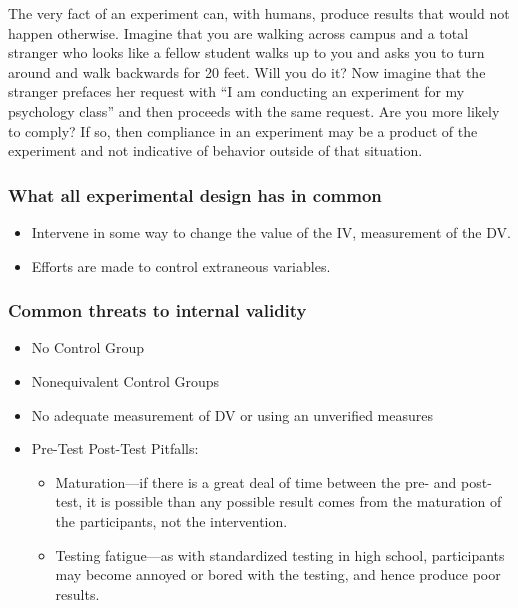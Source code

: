 \begin{refsection}
The very fact of an experiment can, with humans, produce results that would not happen otherwise. Imagine that you are walking across campus and a total stranger who looks like a fellow student walks up to you and asks you to turn around and walk backwards for 20 feet. Will you do it? Now imagine that the stranger prefaces her request with “I am conducting an experiment for my psychology class” and then proceeds with the same request. Are you more likely to comply? If so, then compliance in an experiment may be a product of the experiment and not indicative of behavior outside of that situation.

\subsubsection{What all experimental design has in common}
\label{whatallexperimentaldesignhasincommon}

\begin{itemize}
\item Intervene in some way to change the value of the IV, measurement of the DV.

\item Efforts are made to control extraneous variables.

\end{itemize}

\subsubsection{Common threats to internal validity}
\label{commonthreatstointernalvalidity}

\begin{itemize}
\item No Control Group

\item Nonequivalent Control Groups

\item No adequate measurement of DV or using an unverified measures

\item Pre-Test Post-Test Pitfalls:

\begin{itemize}
\item Maturation---if there is a great deal of time between the pre- and post-test, it is possible than any possible result comes from the maturation of the participants, not the intervention.

\item Testing fatigue---as with standardized testing in high school, participants may become annoyed or bored with the testing, and hence produce poor results.


\end{itemize}
\end{itemize}
\end{refsection}
